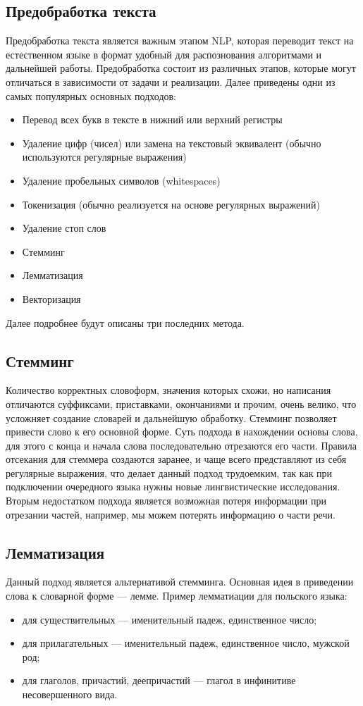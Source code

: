 	\subsection{Предобработка текста}
		Предобработка текста является важным этапом NLP, которая переводит текст на естественном языке в формат удобный для распознования алгоритмами и дальнейшей работы. Предобработка состоит из различных этапов, которые могут отличаться в зависимости от задачи и реализации. Далее приведены одни из самых популярных основных подходов:
	\begin{itemize}
		\item Перевод всех букв в тексте в нижний или верхний регистры
		\item Удаление цифр (чисел) или замена на текстовый эквивалент (обычно используются регулярные выражения)
		\item Удаление пробельных символов (whitespaces)
		\item Токенизация (обычно реализуется на основе регулярных выражений)
		\item Удаление стоп слов
		\item Стемминг
		\item Лемматизация
		\item Векторизация
	\end{itemize}
	Далее подробнее будут описаны три последних метода.

	\subsection{Стемминг}
		Количество корректных словоформ, значения которых схожи, но написания отличаются суффиксами, приставками, окончаниями и прочим, очень велико, что усложняет создание словарей и дальнейшую обработку. Стемминг позволяет привести слово к его основной форме. Суть подхода в нахождении основы слова, для этого с конца и начала слова последовательно отрезаются его части. Правила отсекания для стеммера создаются заранее, и чаще всего представляют из себя регулярные выражения, что делает данный подход трудоемким, так как при подключении очередного языка нужны новые лингвистические исследования. Вторым недостатком подхода является возможная потеря информации при отрезании частей, например, мы можем потерять информацию о части речи.

	\subsection{Лемматизация}
		Данный подход является альтернативой стемминга. Основная идея в приведении слова к словарной форме — лемме. 				Пример лемматиации для польского языка:
		\begin{itemize}
			\item для существительных — именительный падеж, единственное число;
			\item для прилагательных — именительный падеж, единственное число, мужской род;
			\item для глаголов, причастий, деепричастий — глагол в инфинитиве несовершенного вида.
		\end{itemize}
		

